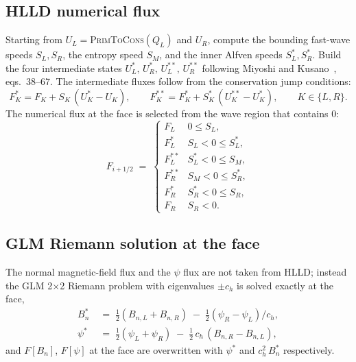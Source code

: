 \documentclass[11pt]{article}
\begin{document}
\subsection{HLLD numerical flux}

Starting from $U_L = $\textsc{PrimToCons}$(Q_L)$ and $U_R$, compute the bounding fast-wave speeds $S_L,S_R$, the entropy speed $S_M$, and the inner Alfven speeds $S^{*}_{L}, S^{*}_{R}$.  Build the four intermediate states $U^{*}_{L},\,U^{*}_{R},\,U^{**}_{L},\,U^{**}_{R}$ following Miyoshi and Kusano~\cite{miyoshi2005}, eqs.~38--67.  The intermediate fluxes follow from the conservation jump conditions:
\begin{equation}
F^{*}_{K} = F_{K} + S_K\,(U^{*}_{K} - U_{K}),
\qquad
F^{**}_{K} = F^{*}_{K} + S^{*}_{K}\,(U^{**}_{K} - U^{*}_{K}),
\qquad K\in\{L,R\}.
\label{eq:hlld-stars-app}
\end{equation}
The numerical flux at the face is selected from the wave region that contains $0$:
\begin{equation}
F_{i+1/2} \;=\; \begin{cases}
F_L           & 0 \le S_L, \\
F^{*}_{L}     & S_L < 0 \le S^{*}_{L}, \\
F^{**}_{L}    & S^{*}_{L} < 0 \le S_M, \\
F^{**}_{R}    & S_M < 0 \le S^{*}_{R}, \\
F^{*}_{R}     & S^{*}_{R} < 0 \le S_R, \\
F_R           & S_R < 0.
\end{cases}
\label{eq:hlld-select-app}
\end{equation}

\subsection{GLM Riemann solution at the face}

The normal magnetic-field flux and the $\psi$ flux are not taken from HLLD; instead the GLM 2$\times$2 Riemann problem with eigenvalues $\pm c_h$ is solved exactly at the face,
\begin{align}
B^{*}_{n} &\;=\; \tfrac{1}{2}(B_{n,L} + B_{n,R})
                 \;-\; \tfrac{1}{2}(\psi_R - \psi_L)/c_h,
  \label{eq:glm-bn-app}\\
\psi^{*}  &\;=\; \tfrac{1}{2}(\psi_L + \psi_R)
                 \;-\; \tfrac{1}{2}\,c_h\,(B_{n,R} - B_{n,L}),
  \label{eq:glm-psi-app}
\end{align}
and $F[B_n]$, $F[\psi]$ at the face are overwritten with $\psi^{*}$ and $c_h^{2}\,B^{*}_{n}$ respectively.
\end{document}
